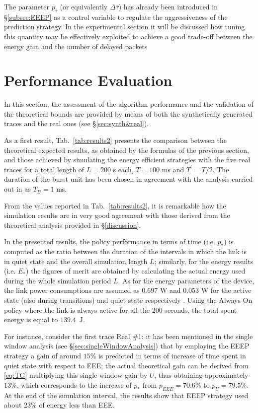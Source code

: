 \documentclass[journal,10pt,twoside,final]{IEEEtran}
\begin{document}
The parameter $p_{\bar{\tau}}$ (or equivalently $\Delta \bar{\tau}$) has already been introduced in \S\ref{subsec:EEEP} as a control variable to regulate the aggressiveness of the prediction strategy.
In the experimental section it will be discussed how tuning this quantity may be effectively exploited to achieve a good trade-off between the energy gain and the number of delayed packets 

\section{Performance Evaluation}
\label{sec:performance-evaluation}

In this section, the assessment of the algorithm performance and the validation of the theoretical bounds are provided by means of both the synthetically generated traces and the real ones (see \S\ref{sec:synth&real}).

As a first result, Tab.~\ref{tab:results2} presents the comparison between the theoretical expected results, as obtained by the formulas of the previous section, and those achieved by simulating the energy efficient strategies with the five real traces for a total length of $L=200$ s each, $T = 100$ ms and $T^\prime = T/2$. The duration of the burst unit has been chosen in agreement with the analysis carried out in \cite{ReviriegoMaestroHernandez10} as $T_B=1$ ms. 

From the values reported in Tab.~\ref{tab:results2}, it is remarkable how the simulation results are in very good agreement with those derived from the theoretical analysis provided in \S\ref{discussion}. 

In the presented results, the policy performance in terms of time (i.e. $p_\ast$) is computed as the ratio between the duration of the intervals in which the link is in quiet state and the overall simulation length $L$; similarly, for the energy results (i.e. $E_\ast$) the figures of merit are obtained by calculating the actual energy used during the whole simulation period $L$.
As for the energy parameters of the device, the link power consumptions are assumed as $0.697$ W and $0.053$ W for the active state (also during transitions) and quiet state respectively \cite{intel}. Using the Always-On policy where the link is always active for all the 200 seconds, the total spent energy is equal to $139.4$~J. 

For instance, consider the first trace Real \#1: it has been mentioned in the single window analysis (see \S\ref{sec:singleWindowAnalysis}) that by employing the EEEP strategy a gain of around $15\%$ is predicted in terms of increase of time spent in quiet state with respect to EEE; the actual theoretical gain can be derived from \eqref{eq:TG} multiplying this single window gain by $U$, thus obtaining approximately $13\%$, which corresponds to the increase of $p_\ast$ from $p_{EEE}=70.6\%$ to $p_{U}=79.5\%$. At the end of the simulation interval, the results show that EEEP strategy used about $23 \%$ of energy less than EEE.
\end{document}
